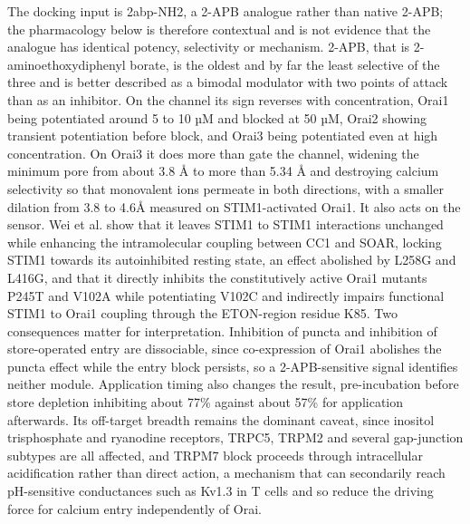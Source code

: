 The docking input is 2abp-NH2, a 2-APB analogue rather than native 2-APB; the pharmacology below is therefore contextual and is not evidence that the analogue has identical potency, selectivity or mechanism. 2-APB, that is 2-aminoethoxydiphenyl borate, is the oldest and by far the least selective of the three and is better described as a bimodal modulator with two points of attack than as an inhibitor. On the channel its sign reverses with concentration, Orai1 being potentiated around 5 to 10 µM and blocked at 50 µM, Orai2 showing transient potentiation before block, and Orai3 being potentiated even at high concentration. On Orai3 it does more than gate the channel, widening the minimum pore from about 3.8 Å to more than 5.34 Å and destroying calcium selectivity so that monovalent ions permeate in both directions, with a smaller dilation from 3.8 to 4.6Å measured on STIM1-activated Orai1. It also acts on the sensor. Wei et al. show that it leaves STIM1 to STIM1 interactions unchanged while enhancing the intramolecular coupling between CC1 and SOAR, locking STIM1 towards its autoinhibited resting state, an effect abolished by L258G and L416G, and that it directly inhibits the constitutively active Orai1 mutants P245T and V102A while potentiating V102C and indirectly impairs functional STIM1 to Orai1 coupling through the ETON-region residue K85. Two consequences matter for interpretation. Inhibition of puncta and inhibition of store-operated entry are dissociable, since co-expression of Orai1 abolishes the puncta effect while the entry block persists, so a 2-APB-sensitive signal identifies neither module. Application timing also changes the result, pre-incubation before store depletion inhibiting about 77\% against about 57\% for application afterwards. Its off-target breadth remains the dominant caveat, since inositol trisphosphate and ryanodine receptors, TRPC5, TRPM2 and several gap-junction subtypes are all affected, and TRPM7 block proceeds through intracellular acidification rather than direct action, a mechanism that can secondarily reach pH-sensitive conductances such as Kv1.3 in T cells and so reduce the driving force for calcium entry independently of Orai.

